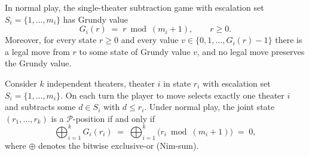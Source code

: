 \documentclass[10pt,a4paper]{amsart}
\begin{document}
\begin{lemma}\label{lem:grundy}
In normal play, the single-theater subtraction game with escalation set
$S_i=\{1,\dots,m_i\}$ has Grundy value
\[
  G_i(r) \;=\; r \bmod (m_i+1), \qquad r \ge 0 .
\]
Moreover, for every state $r\ge 0$ and every value
$v \in \{0,1,\dots,G_i(r)-1\}$ there is a legal move from $r$ to some
state of Grundy value $v$, and no legal move preserves the Grundy value.
\end{lemma}

\begin{theorem}\label{thm:B}
Consider $k$ independent theaters, theater $i$ in state $r_i$ with
escalation set $S_i=\{1,\dots,m_i\}$. On each turn the player to move
selects exactly one theater $i$ and subtracts some $d\in S_i$ with
$d\le r_i$. Under normal play, the joint state $(r_1,\dots,r_k)$ is a
$\mathcal{P}$-position if and only if
\[
  \bigoplus_{i=1}^{k} G_i(r_i)
  \;=\;
  \bigoplus_{i=1}^{k}\big(r_i \bmod (m_i+1)\big)
  \;=\; 0,
\]
where $\oplus$ denotes the bitwise exclusive-or (Nim-sum).
\end{theorem}
\end{document}

